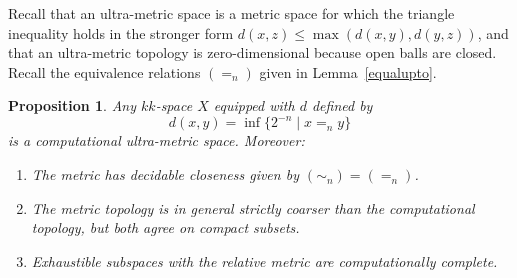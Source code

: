 \documentclass[10pt]{article}
\newtheorem{prop}[cor]{Proposition}
\begin{document}
Recall that an ultra-metric space is a metric space for which the
triangle inequality holds in the stronger form $d(x,z) \le
\max(d(x,y),d(y,z))$, and that an ultra-metric topology is
zero-dimensional because open balls are closed. Recall the equivalence
relations $(=_n)$ given in Lemma~\ref{equalupto}.
\begin{prop} \label{strictly:coarser}
  Any $kk$-space $X$ equipped with $d$ defined by
  \[
  d(x,y) = \inf \{2^{-n} \mid x =_n y\}
  \]
  is a computational ultra-metric space. Moreover:
\begin{enumerate}
\item The metric has decidable closeness given by $(\sim_n)=(=_n)$.
\item The metric topology is in general strictly coarser
than the computational topology, but both agree on compact subsets.
\item Exhaustible subspaces with the relative metric are computationally complete.
\end{enumerate}
\end{prop}
\end{document}
